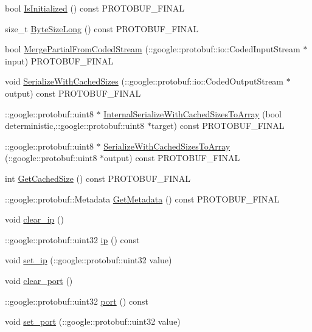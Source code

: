 \begin{DoxyCompactItemize}
\item 
bool \hyperlink{class_advertisement_a17b975dd2369fc638f79d343fa2f6c53}{Is\+Initialized} () const P\+R\+O\+T\+O\+B\+U\+F\+\_\+\+F\+I\+N\+AL
\item 
size\+\_\+t \hyperlink{class_advertisement_aac016bf3cd669a9cf524701559910c7f}{Byte\+Size\+Long} () const P\+R\+O\+T\+O\+B\+U\+F\+\_\+\+F\+I\+N\+AL
\item 
bool \hyperlink{class_advertisement_a2fae885c5e22e7dcce6fb1d40814235f}{Merge\+Partial\+From\+Coded\+Stream} (\+::google\+::protobuf\+::io\+::\+Coded\+Input\+Stream $\ast$input) P\+R\+O\+T\+O\+B\+U\+F\+\_\+\+F\+I\+N\+AL
\item 
void \hyperlink{class_advertisement_ae545a72f737ab9d1f7668169ff5c0e67}{Serialize\+With\+Cached\+Sizes} (\+::google\+::protobuf\+::io\+::\+Coded\+Output\+Stream $\ast$output) const P\+R\+O\+T\+O\+B\+U\+F\+\_\+\+F\+I\+N\+AL
\item 
\+::google\+::protobuf\+::uint8 $\ast$ \hyperlink{class_advertisement_aab2bd9a563f7db7751d05a5979f4c24c}{Internal\+Serialize\+With\+Cached\+Sizes\+To\+Array} (bool deterministic,\+::google\+::protobuf\+::uint8 $\ast$target) const P\+R\+O\+T\+O\+B\+U\+F\+\_\+\+F\+I\+N\+AL
\item 
\+::google\+::protobuf\+::uint8 $\ast$ \hyperlink{class_advertisement_a9b1ce6ff8dd10eead2f754b6dec6885c}{Serialize\+With\+Cached\+Sizes\+To\+Array} (\+::google\+::protobuf\+::uint8 $\ast$output) const P\+R\+O\+T\+O\+B\+U\+F\+\_\+\+F\+I\+N\+AL
\item 
int \hyperlink{class_advertisement_aede29af7c3f03520bf098ed174c5a080}{Get\+Cached\+Size} () const P\+R\+O\+T\+O\+B\+U\+F\+\_\+\+F\+I\+N\+AL
\item 
\+::google\+::protobuf\+::\+Metadata \hyperlink{class_advertisement_af2aa024564b2fe93a0f48d722cf42405}{Get\+Metadata} () const P\+R\+O\+T\+O\+B\+U\+F\+\_\+\+F\+I\+N\+AL
\item 
void \hyperlink{class_advertisement_a40ff84af1ed3e8149b930caf3516eb24}{clear\+\_\+ip} ()
\item 
\+::google\+::protobuf\+::uint32 \hyperlink{class_advertisement_a79b1546cdf56513b9e585f27795f3f8f}{ip} () const 
\item 
void \hyperlink{class_advertisement_a90f53e0ba30957936fdbee7170355ce9}{set\+\_\+ip} (\+::google\+::protobuf\+::uint32 value)
\item 
void \hyperlink{class_advertisement_aa0b75409373ab4db98a171bcc3de48dd}{clear\+\_\+port} ()
\item 
\+::google\+::protobuf\+::uint32 \hyperlink{class_advertisement_afad4c1b646818833a8bebb7efad53afe}{port} () const 
\item 
void \hyperlink{class_advertisement_af3442ebfa92d77664e92a92f61d6a1db}{set\+\_\+port} (\+::google\+::protobuf\+::uint32 value)
\end{DoxyCompactItemize}
